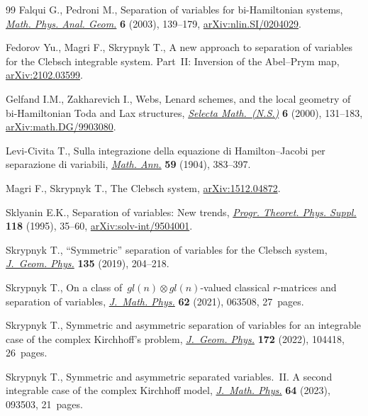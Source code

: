 \begin{thebibliography}{99}
Falqui G., Pedroni M., Separation of variables for bi-{H}amiltonian systems,
 \href{https://doi.org/10.1023/A:1024080315471}{\textit{Math. Phys. Anal.
 Geom.}} \textbf{6} (2003), 139--179,
 \href{http://arxiv.org/abs/nlin.SI/0204029}{arXiv:nlin.SI/0204029}.

Fedorov Yu., Magri F., Skrypnyk T., A new approach to separation of variables
 for the {C}lebsch integrable system. Part~{II}: {I}nversion of the
 {A}bel--{P}rym map, \href{http://arxiv.org/abs/2102.03599}{arXiv:2102.03599}.

Gelfand I.M., Zakharevich I., Webs, {L}enard schemes, and the local geometry of
 bi-{H}amiltonian {T}oda and {L}ax structures,
 \href{https://doi.org/10.1007/PL00001387}{\textit{Selecta Math.~(N.S.)}}
 \textbf{6} (2000), 131--183,
 \href{http://arxiv.org/abs/math.DG/9903080}{arXiv:math.DG/9903080}.

Levi-Civita T., Sulla integrazione della equazione di {H}amilton--{J}acobi per
 separazione di variabili,
 \href{https://doi.org/10.1007/BF01445149}{\textit{Math. Ann.}} \textbf{59}
 (1904), 383--397.

Magri F., Skrypnyk T., The {C}lebsch system,
 \href{http://arxiv.org/abs/1512.04872}{arXiv:1512.04872}.

Sklyanin E.K., Separation of variables: {N}ew trends,
 \href{https://doi.org/10.1143/PTPS.118.35}{\textit{Progr. Theoret. Phys.
 Suppl.}} \textbf{118} (1995), 35--60,
 \href{http://arxiv.org/abs/solv-int/9504001}{arXiv:solv-int/9504001}.

Skrypnyk T., ``{S}ymmetric'' separation of variables for the {C}lebsch system,
 \href{https://doi.org/10.1016/j.geomphys.2018.09.014}{\textit{J.~Geom.
 Phys.}} \textbf{135} (2019), 204--218.

Skrypnyk T., On a class of~{$gl(n)\otimes gl(n)$}-valued classical
 {$r$}-matrices and separation of variables,
 \href{https://doi.org/10.1063/5.0041967}{\textit{J.~Math. Phys.}} \textbf{62}
 (2021), 063508, 27~pages.

Skrypnyk T., Symmetric and asymmetric separation of variables for an integrable
 case of the complex {K}irchhoff's problem,
 \href{https://doi.org/10.1016/j.geomphys.2021.104418}{\textit{J.~Geom.
 Phys.}} \textbf{172} (2022), 104418, 26~pages.

Skrypnyk T., Symmetric and asymmetric separated variables.~{II}. {A} second
 integrable case of the complex {K}irchhoff model,
 \href{https://doi.org/10.1063/5.0152882}{\textit{J.~Math. Phys.}} \textbf{64}
 (2023), 093503, 21~pages.


\end{thebibliography}
